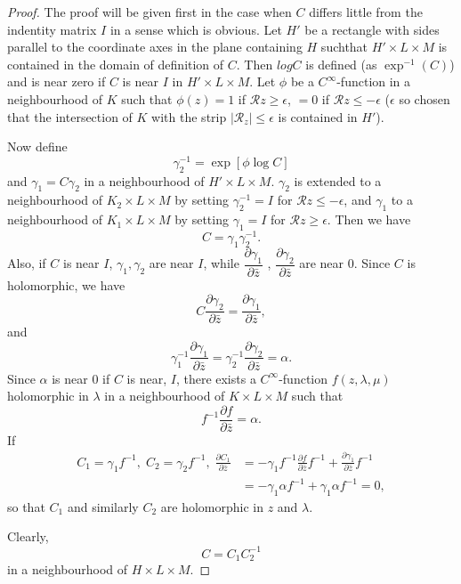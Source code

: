 \begin{proof}
The proof will be given first in the case when $C$ differs little from
the indentity matrix $I$ in a sense which is obvious. Let $H'$ be a
rectangle with sides parallel to the coordinate axes in the plane
containing $H$ such\pageoriginale that $H' \times L \times M$ is
contained in the domain of definition of $C$. Then $log C$ is defined
(as $\exp^{-1}(C)$) and is near zero if $C$ is near $I$ in $H' \times
L \times M$. Let $\phi$ be a $C^\infty$-function in a neighbourhood of
$K$ such that $\phi(z) =1$ if $\mathscr{R} z \geq \epsilon$,  $= 0$ if
$\mathscr{R} z \leq - \epsilon $ ($\epsilon$ so chosen that the intersection of
$K$ with the strip $|\mathscr{R}_z| \leq \epsilon $ is contained in $H'$).

Now define
$$
\gamma^{-1}_2 = \exp [\phi \log C]
$$
and $\gamma_1 = C \gamma_2$ in a neighbourhood of $H' \times L \times
M$. $\gamma_2$ is extended to a neighbourhood of $K_2 \times L \times
M$ by setting $\gamma^{-1}_2 = I$ for $\mathscr{R} z \leq - \epsilon$, and
$\gamma_1$ to a neighbourhood of $K_1 \times L \times M$ by setting
$\gamma_1 = I$ for $\mathscr{R}z \geq \epsilon$. Then we have 
$$
C = \gamma_1 \gamma^{-1}_2. 
$$
Also, if $C$ is near $I$, $\gamma_1, \gamma_2$ are near $I$, while
$\dfrac{\partial \gamma_1}{\partial \bar{z}}$ , $\dfrac{\partial
  \gamma_2}{\partial \bar{z}}$ are near $0$. Since $C$ is holomorphic,
we have 
$$
C \frac{\partial \gamma_2}{\partial \bar{z}} = \frac{\partial
  \gamma_1}{\partial \bar{z}},
$$
and 
$$
\gamma^{-1}_1 \frac{\partial \gamma_1}{\partial \bar{z}} =
\gamma^{-1}_2 \frac{\partial \gamma_2}{\partial \bar{z}} = \alpha. 
$$
Since $\alpha$ is near 0 if $C$ is near, $I$, there exists a
$C^\infty$-function $f(z, \lambda, \mu)$ holomorphic in $\lambda$ in a
neighbourhood of $K \times L \times M$ such that 
$$
f^{-1} \frac{\partial f}{\partial \bar{z}} = \alpha.
$$
If 
\begin{align*}
C_1 = \gamma_1 f^{-1}, \; C_2 = \gamma_2 f^{-1}, \;  \frac{\partial
  C_1}{\partial \bar{z}} & = - \gamma_1 f^{-1} \frac{\partial
  f}{\partial \bar{z}} f^{-1} + \frac{\partial \gamma_1}{\partial
  \bar{z}} f^{-1}\\
& = -\gamma_1 \alpha f^{-1} + \gamma_1 \alpha f^{-1} = 0,
\end{align*}
so that $C_1$ and similarly $C_2$ are holomorphic in $z$ and
$\lambda$. 

Clearly,\pageoriginale 
$$
C = C_1 C^{-1}_2
$$
in a neighbourhood of $H \times L \times M$.


\end{proof}
